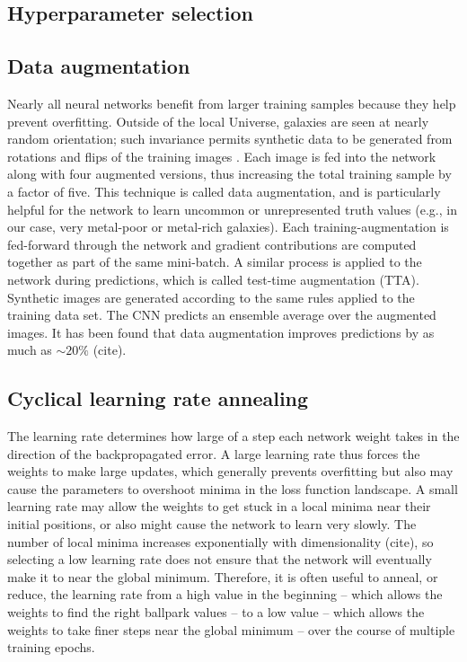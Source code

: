 \documentclass[fleqn,usenatbib]{mnras}
\begin{document}
\subsection{Hyperparameter selection}

\subsection{Data augmentation}\label{sec:data aug}
Nearly all neural networks benefit from larger training samples because they help prevent overfitting.
Outside of the local Universe, galaxies are seen at nearly random orientation; such invariance permits synthetic data to be generated from rotations and flips of the training images \citep[see, e.g.,][]{2014arXiv1409.1556S}.
Each image is fed into the network along with four augmented versions, thus increasing the total training sample by a factor of five.
This technique is called data augmentation, and is particularly helpful for the network to learn uncommon or unrepresented truth values (e.g., in our case, very metal-poor or metal-rich galaxies).
Each training-augmentation is fed-forward through the network and gradient contributions are computed together as part of the same mini-batch.
A similar process is applied to the network during predictions, which is called test-time augmentation (TTA).
Synthetic images are generated according to the same rules applied to the training data set.
The CNN predicts an ensemble average over the augmented images.
It has been found that data augmentation improves predictions by as much as $\sim 20\%$ (cite).

\subsection{Cyclical learning rate annealing}\label{sec:learning rate}
The learning rate determines how large of a step each network weight takes in the direction of the backpropagated error.
A large learning rate thus forces the weights to make large updates, which generally prevents overfitting but also may cause the parameters to overshoot minima in the loss function landscape.
A small learning rate may allow the weights to get stuck in a local minima near their initial positions, or also might cause the network to learn very slowly.
The number of local minima increases exponentially with dimensionality (cite), so selecting a low learning rate does not ensure that the network will eventually make it to near the global minimum.
Therefore, it is often useful to anneal, or reduce, the learning rate from a high value in the beginning -- which allows the weights to find the right ballpark values -- to a low value -- which allows the weights to take finer steps near the global minimum -- over the course of multiple training epochs.
\end{document}
